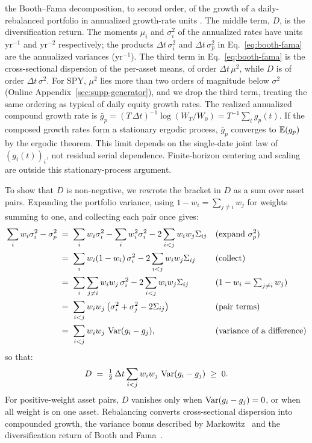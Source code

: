 the Booth--Fama decomposition, to second order, of the growth of a
daily-rebalanced portfolio in annualized growth-rate units
\cite{boothFama1992, markowitz1976longRun}. The middle term, $D$, is the diversification return. The
moments $\mu_i$ and $\sigma_i^2$ of the annualized rates
have units $\mathrm{yr}^{-1}$ and $\mathrm{yr}^{-2}$ respectively;
the products $\Delta t\,\sigma_i^2$ and $\Delta t\,\sigma_p^2$ in
Eq.~\eqref{eq:booth-fama} are the annualized variances
($\mathrm{yr}^{-1}$). The third term in Eq.~\eqref{eq:booth-fama} is
the cross-sectional dispersion of the per-asset means, of order
$\Delta t\,\mu^2$, while $D$ is of order $\Delta t\,\sigma^2$. For
SPY, $\mu^2$ lies more than two orders of magnitude below $\sigma^2$
(Online Appendix~\ref{sec:supp-generator}), and we drop the third term,
treating the same ordering as typical of daily equity growth rates.
The realized annualized compound growth rate is
$\bar g_p = (T\,\Delta t)^{-1}\log(W_T/W_0) = T^{-1}\sum_{t} g_p(t)$.
If the composed growth rates form a stationary ergodic process,
$\bar g_p$ converges to $\mathbb{E}(g_p)$ by the ergodic theorem. This limit depends on the single-date joint law of $(g_i(t))_i$, not residual serial dependence. Finite-horizon centering and scaling are outside this stationary-process argument.

To show that $D$ is non-negative, we rewrote the bracket in $D$ as a
sum over asset pairs. Expanding the portfolio variance, using
$1 - w_i = \sum_{j \ne i} w_j$ for weights summing to one, and
collecting each pair once gives:
\begin{align}
  \sum_i w_i \sigma_i^2 - \sigma_p^2
   &\;=\; \sum_i w_i \sigma_i^2 - \sum_i w_i^2 \sigma_i^2
     - 2 \sum_{i<j} w_i w_j \Sigma_{ij}
     && \text{(expand $\sigma_p^2$)} \notag \\
   &\;=\; \sum_i w_i (1 - w_i)\, \sigma_i^2
     - 2 \sum_{i<j} w_i w_j \Sigma_{ij}
     && \text{(collect)} \notag \\
   &\;=\; \sum_i \sum_{j \ne i} w_i w_j\, \sigma_i^2
     - 2 \sum_{i<j} w_i w_j \Sigma_{ij}
     && \text{($1 - w_i = \textstyle\sum_{j \ne i} w_j$)} \notag \\
   &\;=\; \sum_{i<j} w_i w_j
     \left(\sigma_i^2 + \sigma_j^2 - 2\Sigma_{ij}\right)
     && \text{(pair terms)} \notag \\
   &\;=\; \sum_{i<j} w_i w_j \,\operatorname{Var}(g_i - g_j),
     && \text{(variance of a difference)}
  \label{eq:pair-identity}
\end{align}
so that:
\begin{equation}
  D \;=\; \tfrac{1}{2}\,\Delta t \sum_{i<j} w_i w_j \,\operatorname{Var}(g_i - g_j)
  \;\ge\; 0.
  \label{eq:dr-pairwise}
\end{equation}
For positive-weight asset pairs, $D$ vanishes only when $\operatorname{Var}(g_i-g_j)=0$, or when all weight is on one asset. Rebalancing converts cross-sectional dispersion into compounded growth, the variance bonus described by Markowitz~\cite{markowitz1976longRun} and the diversification return of Booth and Fama~\cite{boothFama1992}.

